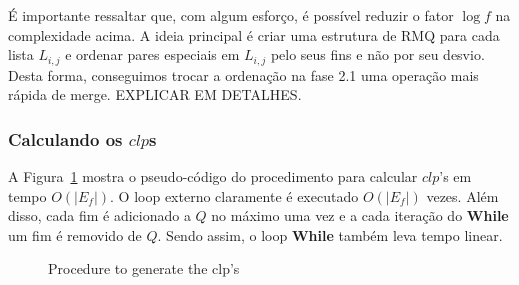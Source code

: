 \documentclass[12pt]{article}
\begin{document}
É importante ressaltar que, com algum esforço, é possível reduzir o fator 
$\log f$ na complexidade acima. A ideia principal é criar uma estrutura de RMQ
para cada lista $L_{i,j}$ e ordenar pares especiais em  $L_{i, j}$ pelo seus fins
e não por seu desvio. Desta forma, conseguimos trocar a ordenação na fase 2.1 
uma operação mais rápida de merge. EXPLICAR EM DETALHES.


\subsubsection{Calculando os $clp$s}
A Figura~\ref{fig:clp} mostra o pseudo-código do procedimento
para calcular $clp$'s em tempo $O(|E_f|)$. O loop externo
claramente é executado $O(|E_f|)$ vezes. Além disso, 
cada fim é adicionado a $Q$ no máximo uma vez e a cada iteração
do {\bf While} um fim é removido de $Q$. Sendo assim,
o loop {\bf While} também leva tempo linear.


\begin{figure}


\caption{Procedure to generate the clp's}

\label{fig:clp} 

\normalsize

 \end{figure}
\end{document}
